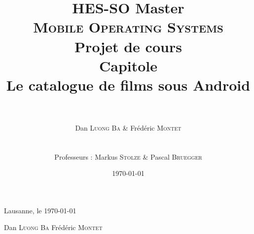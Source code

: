 \documentclass[a4paper, 11pt]{report}
\title{\huge{HES-SO Master} \\ \Huge{\textbf{\textsc{Mobile Operating Systems}}} \\
\LARGE{Projet de cours} \\
\vspace{2cm} \huge{\textbf{Capitole}} \\
\vspace{1cm} \Large{Le catalogue de films sous Android} }
\author{\\ \\ Dan \textsc{Luong Ba} \& Frédéric \textsc{Montet} \\
\\ \\
Professeurs : Markus \textsc{Stolze} \& Pascal \textsc{Bruegger} \\
}
\date{\today}
\begin{document}
\maketitle %
\newpage

\tableofcontents
\newpage







\vspace{3cm}
Lausanne, le \today

\vspace{1.5cm}

\hspace{2cm} Dan \textsc{Luong Ba}
\hspace{5cm} Frédéric \textsc{Montet}

\vspace{2cm}


%
%


%
\end{document}
